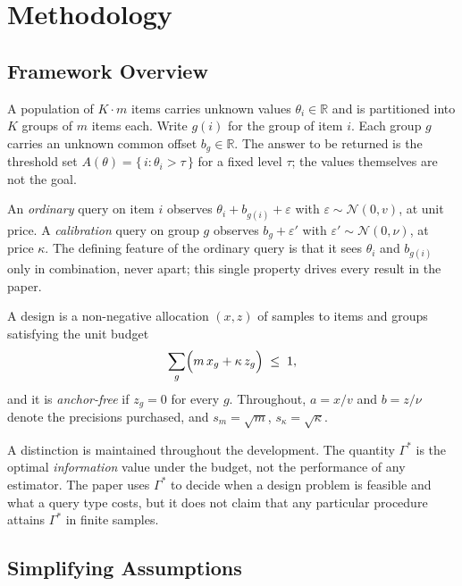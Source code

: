 \section{Methodology}
\label{sec:setting}

\subsection{Framework Overview}

A population of $K\cdot m$ items carries unknown values $\theta_{i}\in\mathbb{R}$ and is
partitioned into $K$ groups of $m$ items each. Write $g(i)$ for the group of item $i$. Each
group $g$ carries an unknown common offset $b_{g}\in\mathbb{R}$. The answer to be returned
is the threshold set $A(\theta)=\{\,i:\theta_{i}>\tau\,\}$ for a fixed level $\tau$; the
values themselves are not the goal.

An \emph{ordinary} query on item $i$ observes $\theta_{i}+b_{g(i)}+\varepsilon$ with
$\varepsilon\sim\mathcal{N}(0,v)$, at unit price. A \emph{calibration} query on group $g$
observes $b_{g}+\varepsilon'$ with $\varepsilon'\sim\mathcal{N}(0,\nu)$, at price $\kappa$.
The defining feature of the ordinary query is that it sees $\theta_{i}$ and $b_{g(i)}$ only
in combination, never apart; this single property drives every result in the paper.

A design is a non-negative allocation $(x,z)$ of samples to items and groups satisfying the
unit budget
\begin{equation}
\sum_{g}\Bigl( m\,x_{g} + \kappa\,z_{g} \Bigr) \;\le\; 1 ,
\label{eq:budget}
\end{equation}
and it is \emph{anchor-free} if $z_{g}=0$ for every $g$. Throughout, $a=x/v$ and $b=z/\nu$
denote the precisions purchased, and $s_{m}=\sqrt{m}$, $s_{\kappa}=\sqrt{\kappa}$.

A distinction is maintained throughout the development. The quantity
$\Gamma^{*}$ is the optimal \emph{information} value under the budget, not the performance
of any estimator. The paper uses $\Gamma^{*}$ to decide when a design problem is feasible
and what a query type costs, but it does not claim that any particular procedure attains
$\Gamma^{*}$ in finite samples.

\subsection{Simplifying Assumptions}

